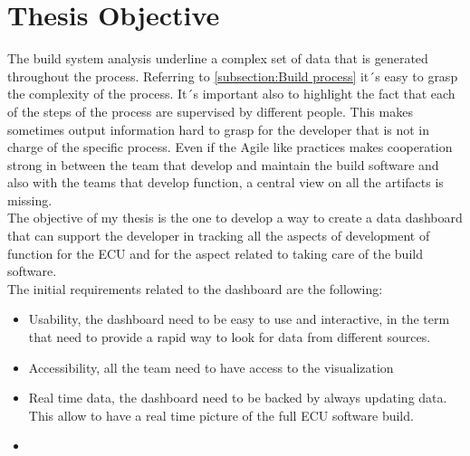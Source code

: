 \documentclass[../main.tex]{subfiles}
\begin{document}
\section{Thesis Objective}
The build system analysis underline a complex set of data that is generated throughout the process. Referring to \ref{subsection:Build process} it´s easy to grasp the complexity of the process. It´s important also to highlight the fact that each of the steps of the process are supervised by different people. This makes sometimes output information hard to grasp for the developer that is not in charge of the specific process. Even if the Agile like practices makes cooperation strong in between the team that develop and maintain the build software and also with the teams that develop function, a central view on all the artifacts is missing.\\
The objective of my thesis is the one to develop a way to create a data dashboard that can support the developer in tracking all the aspects of development of function for the ECU and for the aspect related to taking care of the build software.\\
The initial requirements related to the dashboard are the following:
\begin{itemize}
    \item Usability, the dashboard need to be easy to use and interactive, in the term that need to provide a rapid way to look for data from different sources. 
    \item Accessibility, all the team need to have access to the visualization
    \item Real time data, the dashboard need to be backed by always updating data. This allow to have a real time picture of the full ECU software build. 
    \item 
\end{itemize}
\cleardoublepage
\end{document}
